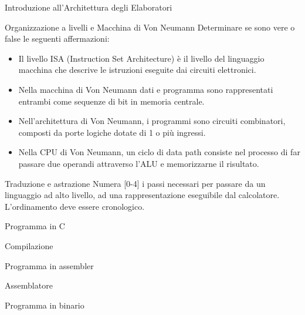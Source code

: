\documentclass[11pt]{article}
\begin{document}
\begin{quiz}{Introduzione all'Architettura degli Elaboratori}

\begin{cloze}[points=1,shuffle=false]{Organizzazione a livelli e Macchina di Von Neumann}
Determinare se sono vere o false le seguenti affermazioni:
\begin{itemize}
    \item Il livello ISA (Instruction Set Architecture) è il livello del linguaggio macchina che descrive le istruzioni eseguite dai circuiti elettronici.
    \item Nella macchina di Von Neumann dati e programma sono rappresentati entrambi come sequenze di bit in memoria centrale.
    \item Nell'architettura di Von Neumann, i programmi sono circuiti combinatori, composti da porte logiche dotate di 1 o più ingressi.
    \item Nella CPU di Von Neumann, un ciclo di data path consiste nel processo di far passare due operandi attraverso l'ALU e memorizzarne il risultato. 
\end{itemize}
\end{cloze}

\begin{matching}[points=1,shuffle=true]{Traduzione e astrazione}
Numera [0-4] i passi necessari per passare da un linguaggio ad alto livello, ad una rappresentazione eseguibile dal calcolatore. L'ordinamento deve essere cronologico.
\item Programma in C            
\item Compilazione              
\item Programma in assembler    
\item Assemblatore              
\item Programma in binario      
\end{matching}


\end{quiz}
\end{document}
